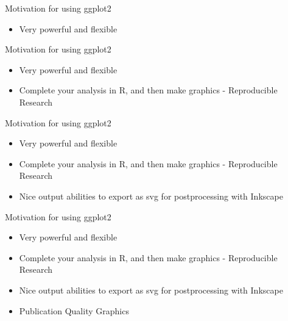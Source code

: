 \documentclass[t,10pt]{beamer}
\begin{document}
\begin{frame}[label={sec:orgheadline5}]{Motivation for using ggplot2}
\begin{itemize}
\item Very powerful and flexible
\end{itemize}
\end{frame}

\begin{frame}[label={sec:orgheadline6}]{Motivation for using ggplot2}
\begin{itemize}
\item Very powerful and flexible
\item Complete your analysis in R, and then make graphics - \alert{Reproducible Research}
\end{itemize}
\end{frame}


\begin{frame}[label={sec:orgheadline7}]{Motivation for using ggplot2}
\begin{itemize}
\item Very powerful and flexible
\item Complete your analysis in R, and then make graphics - \alert{Reproducible Research}
\item Nice output abilities to export as svg for postprocessing with Inkscape
\end{itemize}
\end{frame}

\begin{frame}[label={sec:orgheadline8}]{Motivation for using ggplot2}
\begin{itemize}
\item Very powerful and flexible
\item Complete your analysis in R, and then make graphics - \alert{Reproducible Research}
\item Nice output abilities to export as svg for postprocessing with Inkscape
\item Publication Quality Graphics
\end{itemize}
\end{frame}
\end{document}
